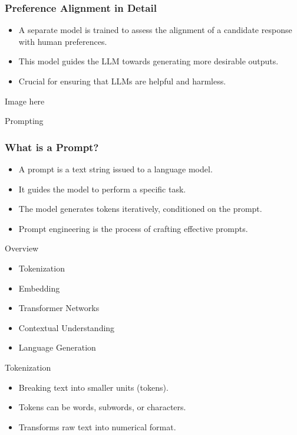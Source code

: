 \begin{frame}
    \frametitle{Preference Alignment in Detail}
    \begin{itemize}
        \item A separate model is trained to assess the alignment of a candidate response with human preferences.
        \item This model guides the LLM towards generating more desirable outputs.
        \item  Crucial for ensuring that LLMs are helpful and harmless.
    \end{itemize}
    Image here
\end{frame}
\begin{frame}
\Huge\centering
Prompting
\end{frame}

\begin{frame}
    \frametitle{What is a Prompt?}
    \begin{itemize}
        \item A prompt is a text string issued to a language model.
        \item It guides the model to perform a specific task.
        \item The model generates tokens iteratively, conditioned on the prompt.
        \item Prompt engineering is the process of crafting effective prompts.
    \end{itemize}
\end{frame}

\begin{frame}{Overview}
  \begin{itemize}
    \item Tokenization
    \item Embedding
    \item Transformer Networks
    \item Contextual Understanding
    \item Language Generation
  \end{itemize}
\end{frame}

\begin{frame}{Tokenization}
  \begin{itemize}
    \item Breaking text into smaller units (tokens).
    \item Tokens can be words, subwords, or characters.
    \item Transforms raw text into numerical format.
  \end{itemize}
\end{frame}

